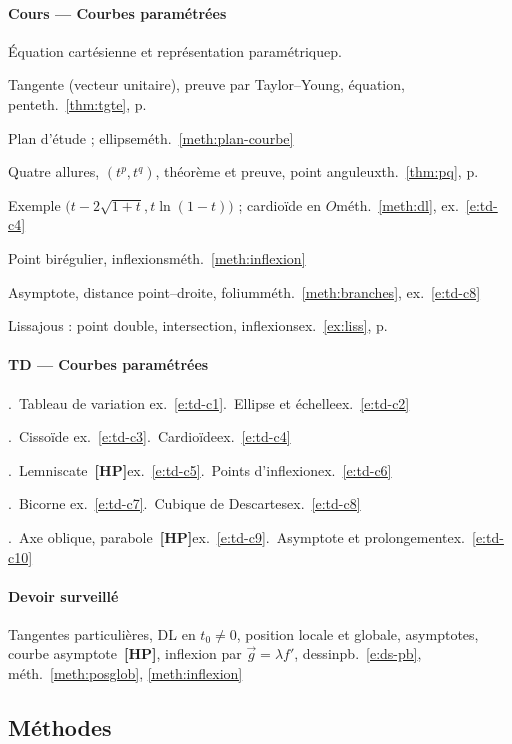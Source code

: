 \documentclass[a4paper,11pt]{article}
\makeatletter
\numberwithin{equation}{section}
\numberwithin{figure}{section}
\numberwithin{table}{section}
\theoremstyle{enonce}
\theoremstyle{exemple}
\theoremstyle{remarque}
\newcommand{\listemethodes}{\@starttoc{met}}
\newcommand{\HP}{\,{\sffamily\bfseries\scriptsize\textcolor{Brique}{[HP]}}}
\makeatother
\begin{document}
{\paragraph{Cours --- Courbes paramétrées}
\noindent Équation cartésienne et représentation paramétrique\dotfill p.~\pageref{sec:courbes}\par
\noindent Tangente (vecteur unitaire), preuve par Taylor--Young, équation, pente\dotfill th.~\ref{thm:tgte}, p.~\pageref{thm:tgte}\par
\noindent Plan d'étude ; ellipse\dotfill méth.~\ref{meth:plan-courbe}\par
\noindent Quatre allures, $(t^p,t^q)$, théorème et preuve, point anguleux\dotfill th.~\ref{thm:pq}, p.~\pageref{thm:pq}\par
\noindent Exemple $\big(t-2\sqrt{1+t},t\ln(1-t)\big)$ ; cardioïde en $O$\dotfill méth.~\ref{meth:dl}, ex.~\ref{e:td-c4}\par
\noindent Point birégulier, inflexions\dotfill méth.~\ref{meth:inflexion}\par
\noindent Asymptote, distance point--droite, folium\dotfill méth.~\ref{meth:branches}, ex.~\ref{e:td-c8}\par
\noindent Lissajous : point double, intersection, inflexions\dotfill ex.~\ref{ex:liss}, p.~\pageref{ex:liss}\par
\paragraph{TD --- Courbes paramétrées}
.~Tableau de variation \dotfill ex.~\ref{e:td-c1}.~Ellipse et échelle\dotfill ex.~\ref{e:td-c2}\par
{}.~Cissoïde \dotfill ex.~\ref{e:td-c3}.~Cardioïde\dotfill ex.~\ref{e:td-c4}\par
{}.~Lemniscate \HP\dotfill ex.~\ref{e:td-c5}.~Points d'inflexion\dotfill ex.~\ref{e:td-c6}\par
{}.~Bicorne \dotfill ex.~\ref{e:td-c7}.~Cubique de Descartes\dotfill ex.~\ref{e:td-c8}\par
{}.~Axe oblique, parabole \HP\dotfill ex.~\ref{e:td-c9}.~Asymptote et prolongement\dotfill ex.~\ref{e:td-c10}\par
\paragraph{Devoir surveillé}
\noindent Tangentes particulières, DL en $t_0\neq0$, position locale et globale, asymptotes, courbe asymptote \HP, inflexion
par $\vec g=\lambda f'$, dessin\dotfill pb.~\ref{e:ds-pb}, méth.~\ref{meth:posglob}, \ref{meth:inflexion}\par
}

\subsection*{Méthodes}
{\footnotesize\begin{multicols}{2}\listemethodes\end{multicols}}
\end{document}
